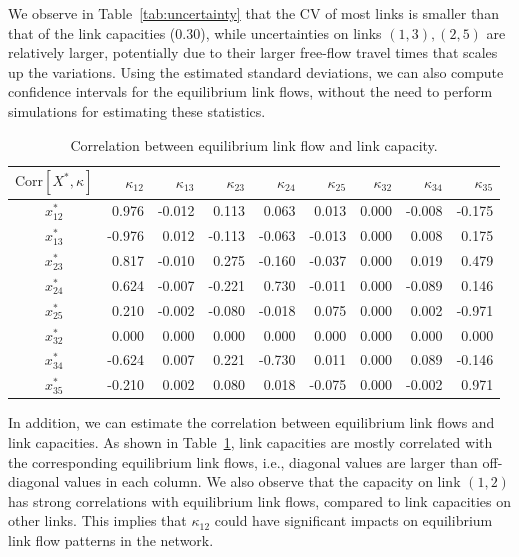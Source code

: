 \documentclass[a4paper,11pt]{article}
\begin{document}
We observe in Table~\ref{tab:uncertainty} that the CV of most links is smaller than that of the link capacities (0.30), while uncertainties on links $(1, 3), (2, 5)$ are relatively larger, potentially due to their larger free-flow travel times that scales up the variations. Using the estimated standard deviations, we can also compute confidence intervals for the equilibrium link flows, without the need to perform simulations for estimating these statistics.

\begin{table}[H]
\captionsetup{justification=centering}
\caption{Correlation between equilibrium link flow and link capacity.}\label{tab:corr}
\setlength\tabcolsep{8pt}
\centering
\begin{tabular}{crrrrrrrr}
 $\text{Corr}[X^*, \kappa]$ & $\kappa_{12}$ &  $\kappa_{13}$      & $\kappa_{23}$      & $\kappa_{24}$ &     $\kappa_{25}$      & $\kappa_{32}$     & $\kappa_{34}$      & $\kappa_{35}$      \\
\toprule
$x^*_{12}$                         & 0.976                 & -0.012 & 0.113  & 0.063  & 0.013  & 0.000 & -0.008 & -0.175 \\
$x^*_{13}$                         & -0.976                & 0.012  & -0.113 & -0.063 & -0.013 & 0.000 & 0.008  & 0.175  \\
$x^*_{2 3}$                         & 0.817                 & -0.010 & 0.275  & -0.160 & -0.037 & 0.000 & 0.019  & 0.479  \\
$x^*_{24}$                         & 0.624                 & -0.007 & -0.221 & 0.730  & -0.011 & 0.000 & -0.089 & 0.146  \\
$x^*_{25}$                          & 0.210                 & -0.002 & -0.080 & -0.018 & 0.075  & 0.000 & 0.002  & -0.971 \\
$x^*_{32}$                         & 0.000                 & 0.000  & 0.000  & 0.000  & 0.000  & 0.000 & 0.000  & 0.000  \\
$x^*_{3 4}$                         & -0.624                & 0.007  & 0.221  & -0.730 & 0.011  & 0.000 & 0.089  & -0.146 \\
$x^*_{35}$                         & -0.210                & 0.002  & 0.080  & 0.018  & -0.075 & 0.000 & -0.002 & 0.971  \\
\bottomrule
\end{tabular}
\end{table}

In addition, we can estimate the correlation between equilibrium link flows and link capacities. As shown in Table~\ref{tab:corr}, link capacities are mostly correlated with the corresponding equilibrium link flows, i.e., diagonal values are larger than off-diagonal values in each column. We also observe that the capacity on link $(1, 2)$ has strong correlations with equilibrium link flows, compared to link capacities on other links. This implies that $\kappa_{12}$ could have significant impacts on equilibrium link flow patterns in the network.
\end{document}
